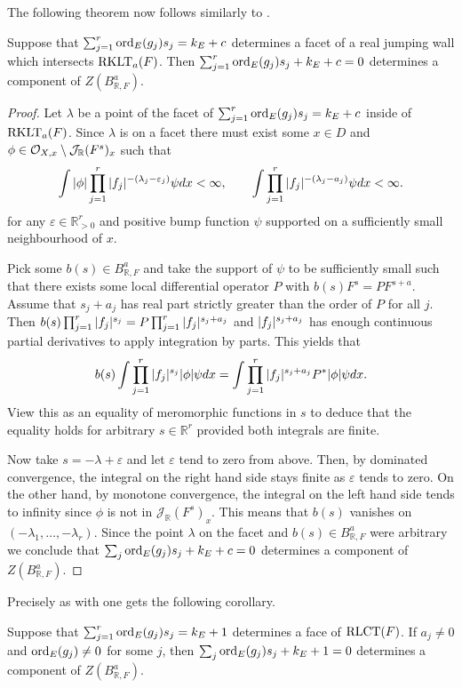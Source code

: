 The following theorem now follows similarly to .
\begin{theorem}
  Suppose that $\sum_{j=1}^r \operatorname{ord}_E(g_j)s_j = k_E + c$ determines a facet of a real jumping wall which intersects $\operatorname{RKLT}_{a}(F)$.
  Then $\sum_{j=1}^r \operatorname{ord}_E(g_j)s_j + k_E + c = 0$ determines a component of $Z(B_{\mathbb{R},F}^a)$.
\end{theorem}
\begin{proof}
  Let $\lambda$ be a point of the facet of $\sum_{j=1}^r \operatorname{ord}_E(g_j)s_j = k_E + c$ inside of $\operatorname{RKLT}_a(F)$.
  Since $\lambda$ is on a facet there must exist some $x\in D$ and $\phi\in \mathcal{O}_{X,x}\setminus \mathcal{J}_\mathbb{R}(F^s)_x$ such that
  $$\int \vert \phi \vert\prod_{j=1}^r\vert f_j \vert^{-(\lambda_j -\varepsilon_j)}\psi dx <  \infty, \qquad \int \prod_{j=1}^r \vert f_j \vert^{-(\lambda_j - a_j)}\psi dx< \infty.$$
  for any $\varepsilon \in \mathbb{R}_{>0}^r$ and positive bump function $\psi$ supported on a sufficiently small neighbourhood of $x$.

  Pick some $b(s) \in B_{\mathbb{R},F}^a$ and take the support of $\psi$ to be sufficiently small such that there exists some local differential operator $P$ with $b(s)F^s = PF^{s+a}$.
  Assume that $s_j+a_j$ has real part strictly greater than the order of $P$ for all $j$.
  Then $b(s) \prod_{j=1}^r \vert f_{j} \vert^{s_j} = P \prod_{j=1}^r \vert f_{j} \vert^{s_j +a_j}$ and $\vert f_{j} \vert^{s_j +a_j}$ has enough continuous partial derivatives to apply integration by parts.
  This yields that
  $$b(s)\int  \prod_{j=1}^r \vert f_{j} \vert^{s_j} \vert \phi \vert\psi dx= \int \prod_{j=1}^r \vert f_{j} \vert^{s_j +a_j} P^* \vert \phi \vert\psi dx.$$
  View this as an equality of meromorphic functions in $s$ to deduce that the equality holds for arbitrary $s\in \mathbb{R}^r$ provided both integrals are finite.

  Now take $s = -\lambda + \varepsilon$ and let $\varepsilon$ tend to zero from above.
  Then, by dominated convergence, the integral on the right hand side stays finite as $\varepsilon$ tends to zero.
  On the other hand, by monotone convergence, the integral on the left hand side tends to infinity since $\phi$ is not in $\mathcal{J}_\mathbb{R}(F^s)_x$.
  This means that $b(s)$ vanishes on $(-\lambda_1,\ldots, -\lambda_r)$.
  Since the point $\lambda$ on the facet and $b(s)\in B_{\mathbb{R},F}^a$ were arbitrary we conclude that $\sum_j \operatorname{ord}_{E}(g_j)s_j +  k_E + c=0$ determines a component of $Z(B_{\mathbb{R},F}^a)$.
\end{proof}
Precisely as with  one gets the following corollary.
\begin{corollary}
  Suppose that $\sum_{j=1}^r \operatorname{ord}_E(g_j)s_j = k_E + 1$ determines a face of $\operatorname{RLCT}(F)$. If $a_j\neq 0$ and $\operatorname{ord}_{E}(g_j)\neq 0$ for some $j$, then $\sum_j \operatorname{ord}_{E}(g_j)s_j +k_E + 1=0$ determines a component of $Z(B_{\mathbb{R},F}^a)$.
\end{corollary}
